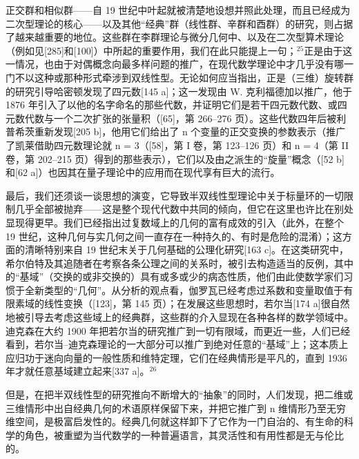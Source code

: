 正交群和相似群——自 19 世纪中叶起就被清楚地设想并照此处理，而且已经成为二次型理论的核心——以及其他“经典”群（线性群、辛群和酉群）的研究，则占据了越来越重要的地位。这些群在李群理论与微分几何中、以及在二次型算术理论（例如见{[}285{]}和{[}100{]}）中所起的重要作用，我们在此只能提上一句；\(^{25}\)正是由于这一情况，也由于对偶概念向最多样问题的推广，在现代数学理论中才几乎没有哪一门不以这种或那种形式牵涉到双线性型。无论如何应当指出，正是（三维）旋转群的研究引导哈密顿发现了四元数{[}145 a{]}；这一发现由 W. 克利福德加以推广，他于 1876 年引入了以他的名字命名的那些代数，并证明它们是若干四元数代数、或四元数代数与一个二次扩张的张量积（{[}65{]}，第 266–276 页）。这些代数四年后被利普希茨重新发现{[}205 b{]}，他用它们给出了 n 个变量的正交变换的参数表示（推广了凯莱借助四元数理论就 n = 3（{[}58{]}，第 I 卷，第 123–126 页）和 n = 4（第 II 卷，第 202–215 页）得到的那些表示），它们以及由之派生的“旋量”概念（{[}52 b{]}和{[}62 a{]}）也因其在量子理论中的应用而在现代享有巨大的流行。

最后，我们还须谈一谈思想的演变，它导致半双线性型理论中关于标量环的一切限制几乎全部被抛弃——这是整个现代代数中共同的倾向，但它在这里也许比在别处显现得更早。我们已经指出过复数域上的几何的富有成效的引入（此外，在整个 19 世纪，这种几何与实几何之间一直存在一种持久的、有时是危险的混淆）；这方面的清晰特别来自 19 世纪末关于几何基础的公理化研究{[}163 c{]}。在这类研究中，希尔伯特及其追随者在考察各条公理之间的关系时，被引去构造适当的反例，其中的“基域”（交换的或非交换的）具有或多或少的病态性质，他们由此使数学家们习惯于全新类型的“几何”。从分析的观点看，伽罗瓦已经考虑过系数和变量取值于有限素域的线性变换（{[}123{]}，第 145 页）；在发展这些思想时，若尔当{[}174 a{]}很自然地被引导去考虑这些域上的经典群，这些群的介入显现在各种各样的数学领域中。迪克森在大约 1900 年把若尔当的研究推广到一切有限域，而更近一些，人们已经看到，若尔当–迪克森理论的一大部分可以推广到绝对任意的“基域”上；这本质上应归功于迷向向量的一般性质和维特定理，它们在经典情形是平凡的，直到 1936 年才就任意基域建立起来{[}337 a{]}。\(^{26}\)

但是，在把半双线性型的研究推向不断增大的“抽象”的同时，人们发现，把二维或三维情形中出自经典几何的术语原样保留下来，并把它推广到 n 维情形乃至无穷维空间，是极富启发性的。经典几何就这样卸下了它作为一门自治的、有生命的科学的角色，被重塑为当代数学的一种普遍语言，其灵活性和有用性都是无与伦比的。

